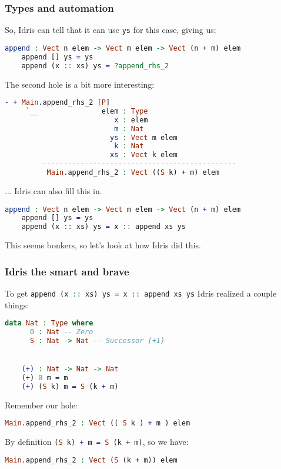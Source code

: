 \documentclass{beamer}
\begin{document}
\begin{frame}[fragile]
  \frametitle{Types and automation}
  So, Idris can tell that it can use \texttt{ys} for this case, giving us:

  \begin{lstlisting}[language=Idris]
    append : Vect n elem -> Vect m elem -> Vect (n + m) elem
    append [] ys = ys
    append (x :: xs) ys = ?append_rhs_2
  \end{lstlisting}

  \pause

  The second hole is a bit more interesting:

  \begin{lstlisting}[language=Idris]
    - + Main.append_rhs_2 [P]
     `__               elem : Type
                          x : elem
                          m : Nat
                         ys : Vect m elem
                          k : Nat
                         xs : Vect k elem
         ----------------------------------------------
          Main.append_rhs_2 : Vect ((S k) + m) elem
  \end{lstlisting}

  \pause

  ... Idris can also fill this in.

  \pause

  \begin{lstlisting}[language=Idris]
    append : Vect n elem -> Vect m elem -> Vect (n + m) elem
    append [] ys = ys
    append (x :: xs) ys = x :: append xs ys
  \end{lstlisting}

  \pause

  This seems bonkers, so let's look at how Idris did this.
\end{frame}

\begin{frame}[fragile]
  \frametitle{Idris the smart and brave}

  To get \lstinline[language=Idris, columns=fixed]{append (x :: xs) ys = x :: append xs ys} Idris realized a couple things:

  \begin{lstlisting}[language=Idris]
    data Nat : Type where
      0 : Nat -- Zero
      S : Nat -> Nat -- Successor (+1)


    (+) : Nat -> Nat -> Nat
    (+) 0 m = m
    (+) (S k) m = S (k + m)
  \end{lstlisting}

  \pause
  Remember our hole:

  \begin{lstlisting}[language=Idris]
    Main.append_rhs_2 : Vect (( S k ) + m ) elem
  \end{lstlisting}

  \pause
  By definition \lstinline[language=Idris, columns=fixed]{(S k) + m = S (k + m)}, so we have:

  \pause
  \begin{lstlisting}[language=Idris]
    Main.append_rhs_2 : Vect (S (k + m)) elem
  \end{lstlisting}
\end{frame}
\end{document}
